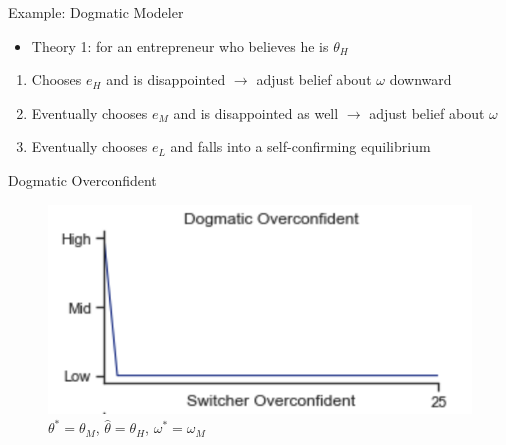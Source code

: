 \documentclass[aspectratio=169]{beamer}
\begin{document}
\begin{frame}{Example: Dogmatic Modeler}
\begin{itemize}
    \item Theory 1: for an entrepreneur who believes he is $\theta_H$
    \end{itemize}
    \bigskip
    \begin{enumerate}
        \item Chooses $e_H$ and is disappointed $\rightarrow$ adjust belief about $\omega$ downward\\
        \bigskip
        \item Eventually chooses $e_M$ and is disappointed as well $\rightarrow$ adjust belief about $\omega$\\
        \bigskip
        \item Eventually chooses $e_L$ and falls into a self-confirming equilibrium
    \end{enumerate}
    
    
\end{frame}

\begin{frame}{Dogmatic Overconfident}
    \begin{figure}
        \centering
        \includegraphics[trim=0 20 0 0, clip]{figures/dogmatic.png}
        \caption{$\theta^*=\theta_M$, $\hat\theta=\theta_H$, $\omega^*=\omega_M$}
    \end{figure}
\end{frame}
\end{document}

